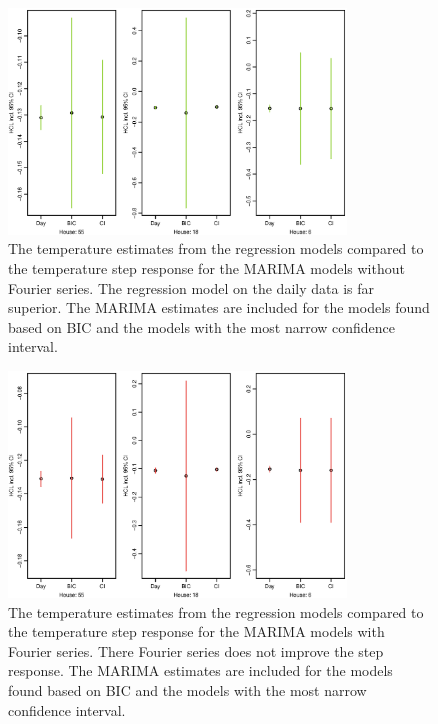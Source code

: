\begin{figure}
    \centering
    \includegraphics[width=0.8\textwidth]{../../../figures/MarimaHCL.eps}
    \caption{The temperature estimates from the regression models compared to the temperature step response for the MARIMA models without Fourier series. The regression model on the daily data is far superior. The MARIMA estimates are included for the models found based on BIC and the models with the most narrow confidence interval.}
    \label{fig:HCL}
\end{figure}

\begin{figure}
    \centering
    \includegraphics[width=0.8\textwidth]{../../../figures/MarimaHCLF.eps}
    \caption{The temperature estimates from the regression models compared to the temperature step response for the MARIMA models with Fourier series. There Fourier series does not improve the step response. The MARIMA estimates are included for the models found based on BIC and the models with the most narrow confidence interval.}
    \label{fig:HCLF}
\end{figure}





